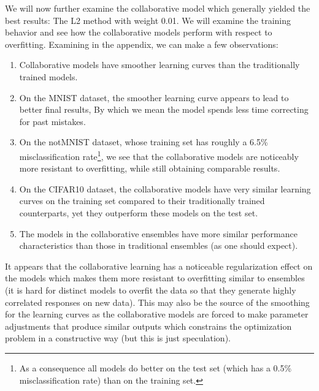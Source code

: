\documentclass[english,a4paper,oneside]{amsart}
\theoremstyle{definition}
\begin{document}
We will now further examine the collaborative model which generally yielded the best results: The L2 method with weight 0.01. We will examine the training behavior and see how the collaborative models perform with respect to overfitting.  Examining  in the appendix, we can make a few observations:
\begin{enumerate}
	\item Collaborative models have smoother learning curves than the traditionally trained models.
	\item On the MNIST dataset, the smoother learning curve appears to lead to better final results, By which we mean the model spends less time correcting for past mistakes.
	\item On the notMNIST dataset, whose training set has roughly a 6.5\% misclassification rate\footnote{As a consequence all models do better on the test set (which has a 0.5\% misclassification rate) than on the training set.}, we see that the collaborative models are noticeably more resistant to overfitting, while still obtaining comparable results.
	\item On the CIFAR10 dataset, the collaborative models have very similar learning curves on the training set compared to their traditionally trained counterparts, yet they outperform these models on the test set.
	\item The models in the collaborative ensembles have more similar performance characteristics than those in traditional ensembles (as one should expect).
\end{enumerate}
It appears that the collaborative learning has a noticeable regularization effect on the models which makes them more resistant to overfitting similar to ensembles (it is hard for distinct models to overfit the data so that they generate highly correlated responses on new data). This may also be the source of the smoothing for the learning curves as the collaborative models are forced to make parameter adjustments that produce similar outputs which constrains the optimization problem in a constructive way (but this is just speculation).
\end{document}

